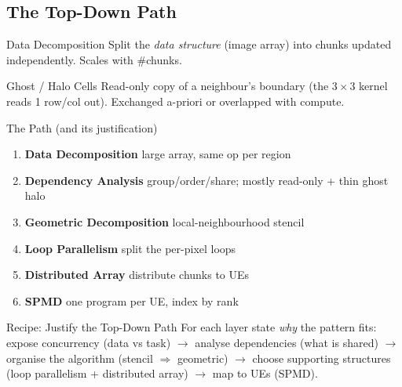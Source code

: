 \multend

\subsection{The Top-Down Path}

\begin{minipage}{0.4\linewidth}

\begin{definition}{Data Decomposition}
    Split the \emph{data structure} (image array) into chunks updated independently. Scales with \#chunks.
\end{definition}

\begin{definition}{Ghost / Halo Cells}
    Read-only copy of a neighbour's boundary (the $3\times3$ kernel reads 1 row/col out). Exchanged a-priori or overlapped with compute.
\end{definition}
\end{minipage}
\begin{minipage}{0.59\linewidth}

\begin{concept}{The Path (and its justification)}
    \begin{enumerate}
        \item \textbf{Data Decomposition} large array, same op per region
        \item \textbf{Dependency Analysis} group/order/share; mostly read-only + thin ghost halo
        \item \textbf{Geometric Decomposition} local-neighbourhood stencil
        \item \textbf{Loop Parallelism} split the per-pixel loops
        \item \textbf{Distributed Array} distribute chunks to UEs
        \item \textbf{SPMD} one program per UE, index by rank
    \end{enumerate}
\end{concept}

\end{minipage}

\begin{KR}{Recipe: Justify the Top-Down Path}
    For each layer state \emph{why} the pattern fits: expose concurrency (data vs task) $\to$ analyse dependencies (what is shared) $\to$ organise the algorithm (stencil $\Rightarrow$ geometric) $\to$ choose supporting structures (loop parallelism + distributed array) $\to$ map to UEs (SPMD).
\end{KR}

